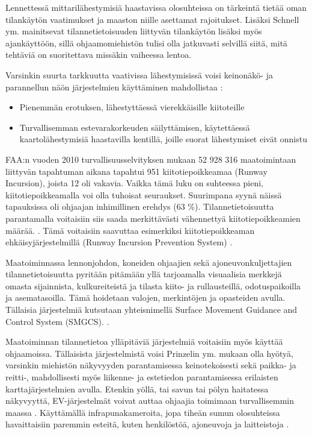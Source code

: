 \documentclass[utf8,bachelor,manualbib]{gradu3}
\begin{document}
Lennettessä mittarilähestymisiä haastavissa olosuhteissa on tärkeintä tietää oman tilankäytön vaatimukset ja maaston niille asettamat rajoitukset. Lisäksi Schnell ym. \citeyearpar{schnellym2004} mainitsevat tilannetietoisuuden liittyvän tilankäytön lisäksi myös ajankäyttöön, sillä ohjaamomiehistön tulisi olla jatkuvasti selvillä siitä, mitä tehtäviä on suoritettava missäkin vaiheessa lentoa. 

Varsinkin suurta tarkkuutta vaativissa lähestymisissä voisi keinonäkö- ja parannellun näön järjestelmien käyttäminen mahdollistaa \citep{schnellym2004}:

\begin{itemize}
\item Pienemmän erotuksen, lähestyttäessä vierekkäisille kiitoteille
\item Turvallisemman estevarakorkeuden säilyttämisen, käytettäessä kaartolähestymisiä haastavilla kentillä, joille suorat lähestymiset eivät onnistu
\end{itemize}

FAA:n vuoden 2010 turvallisuusselvityksen mukaan 52 928 316 maatoimintaan liittyvän tapahtuman aikana tapahtui 951 kiitotiepoikkeamaa (Runway Incursion), joista 12 oli vakavia. Vaikka tämä luku on suhteessa pieni, kiitotiepoikkeamalla voi olla tuhoisat seuraukset. Suurimpana syynä näissä tapauksissa oli ohjaajan inhimillinen erehdys (63 \%). Tilannetietoisuutta parantamalla voitaisiin siis saada merkittävästi vähennettyä kiitotiepoikkeamien määrää. \citep{prinzelym2013}. Tämä voitaisiin saavuttaa esimerkiksi kiitotiepoikkeaman ehkäisyjärjestelmillä (Runway Incursion Prevention System) \citep{crawfordneal2006}.

Maatoiminnassa lennonjohdon, koneiden ohjaajien sekä ajoneuvonkuljettajien tilannetietoisuutta pyritään pitämään yllä tarjoamalla visuaalisia merkkejä omasta sijainnista, kulkureiteistä ja tilasta kiito- ja rullausteillä, odotuspaikoilla ja asematasoilla. Tämä hoidetaan valojen, merkintöjen ja opasteiden avulla. Tällaisia järjestelmiä kutsutaan yhteisnimellä Surface Movement Guidance and Control System (SMGCS). \citep{prinzelym2013}.

Maatoiminnan tilannetietoa ylläpitäviä järjestelmiä voitaisiin myös käyttää ohjaamoissa. Tällaisista järjestelmistä voisi Prinzelin ym. \citeyearpar{prinzelym2013} mukaan olla hyötyä, varsinkin miehistön näkyvyyden parantamisessa keinotekoisesti sekä paikka- ja reitti-,  mahdollisesti myös liikenne- ja estetiedon parantamisessa erilaisten karttajärjestelmien avulla. Etenkin yöllä, tai savun tai pölyn haitatessa näkyvyyttä, EV-järjestelmät voivat auttaa ohjaajia toimimaan turvallisemmin maassa \citep{prinzelym2013}. Käyttämällä infrapunakameroita, jopa tiheän sumun olosuhteissa havaittaisiin paremmin esteitä, kuten henkilöstöä, ajoneuvoja ja laitteistoja \citep{beiergemperlein2004}.
\end{document}

